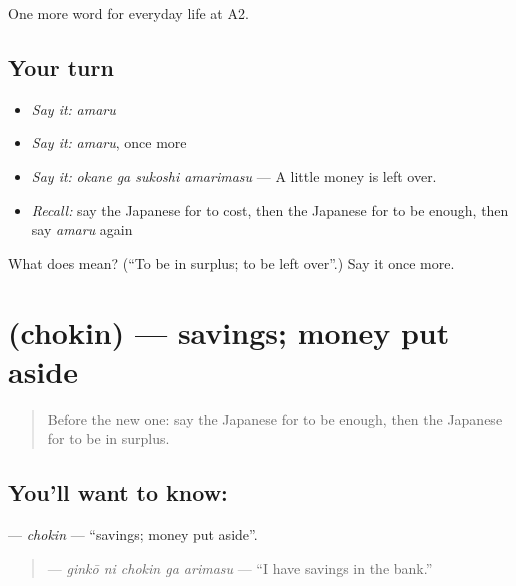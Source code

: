 \begin{grammarlens}[title={What you've built}]
One more word for everyday life at A2.
\end{grammarlens}

\subsection*{Your turn}
\begin{itemize}
\raggedright
  \item \emph{Say it:} \emph{amaru}
  \item \emph{Say it:} \emph{amaru}, once more
  \item \emph{Say it:} \emph{okane ga sukoshi amarimasu} — A little money is left over.
  \item \emph{Recall:} say the Japanese for to cost, then the Japanese for to be enough, then say \emph{amaru} again
\end{itemize}

\begin{tcolorbox}[breakable,colback=teal!4,colframe=teal!35!black,title={Before you move on}]
What does  mean? (\textquotedblleft{}To be in surplus; to be left over\textquotedblright{}.) Say it once more.
\end{tcolorbox}
\section[\texorpdfstring{\ja{ちょきん} (chokin)}{ちょきん (chokin)}]{ (chokin) — savings; money put aside}

\label{lesson:JA-C186-chokin}



\begin{quote}
Before the new one: say the Japanese for to be enough, then the Japanese for to be in surplus.
\end{quote}

\subsection*{You'll want to know: }
\textbf{} — \emph{chokin} — \textquotedblleft{}savings; money put aside\textquotedblright{}.

\begin{quote}
\textbf{  } — \emph{ginkō ni chokin ga arimasu} — \textquotedblleft{}I have savings in the bank.\textquotedblright{}
\end{quote}


